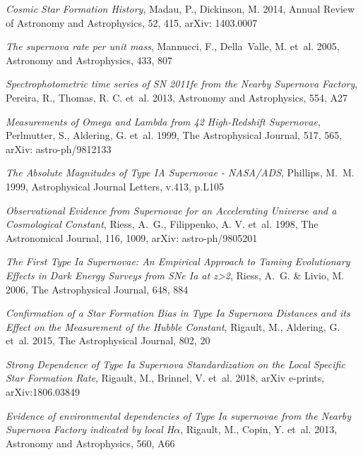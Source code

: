 \documentclass[a4paper, 12pt, svgnames]{article}
\begin{document}
\begin{thebibliography}{23}
{\em Cosmic {Star} {Formation} {History}}, Madau, P., Dickinson, M. 2014, Annual
Review of Astronomy and Astrophysics, 52, 415, arXiv: 1403.0007

{\em The supernova rate per unit mass}, Mannucci, F., Della~Valle, M. et~al.
2005, Astronomy and Astrophysics, 433, 807

{\em Spectrophotometric time series of {SN} 2011fe from the {Nearby} {Supernova}
{Factory}}, Pereira, R., Thomas, R. C. et~al. 2013, Astronomy and Astrophysics,
554, A27

{\em Measurements of {Omega} and {Lambda} from 42 {High}-{Redshift}
{Supernovae}}, Perlmutter, S., Aldering, G. et~al. 1999, The Astrophysical
Journal, 517, 565, arXiv: astro-ph/9812133

{\em The {Absolute} {Magnitudes} of {Type} {IA} {Supernovae} - {NASA}/{ADS}},
Phillips, M.~M. 1999, Astrophysical Journal Letters, v.413, p.L105

{\em Observational {Evidence} from {Supernovae} for an {Accelerating} {Universe}
and a {Cosmological} {Constant}}, Riess, A.~G., Filippenko, A. V. et~al. 1998,
The Astronomical Journal, 116, 1009, arXiv: astro-ph/9805201

{\em The {First} {Type} {Ia} {Supernovae}: {An} {Empirical} {Approach} to
{Taming} {Evolutionary} {Effects} in {Dark} {Energy} {Surveys} from {SNe} {Ia}
at z>2}, Riess, A.~G. \& Livio, M. 2006, The Astrophysical Journal, 648, 884

{\em Confirmation of a {Star} {Formation} {Bias} in {Type} {Ia} {Supernova}
{Distances} and its {Effect} on the {Measurement} of the {Hubble} {Constant}},
Rigault, M., Aldering, G. et~al. 2015, The Astrophysical Journal, 802, 20

{\em Strong {Dependence} of {Type} {Ia} {Supernova} {Standardization} on the
{Local} {Specific} {Star} {Formation} {Rate}}, Rigault, M., Brinnel, V. et~al.
2018, arXiv e-prints, arXiv:1806.03849

{\em Evidence of environmental dependencies of {Type} {Ia} supernovae from the
{Nearby} {Supernova} {Factory} indicated by local {H}$\alpha$}, Rigault, M.,
Copin, Y. et~al. 2013, Astronomy and Astrophysics, 560, A66


\end{thebibliography}
\end{document}
